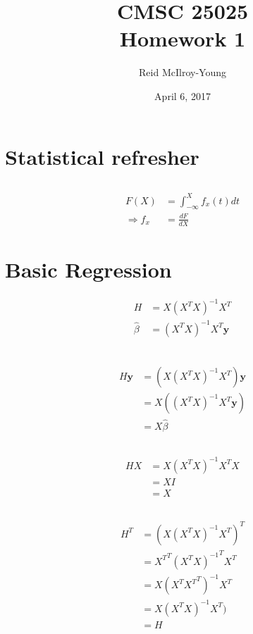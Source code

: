 \documentclass[12pt,a4paper]{article}
\author{Reid McIlroy-Young}
\title{CMSC 25025 \\ Homework 1}
\date{April 6, 2017}
\begin{document}
\maketitle

\section{Statistical refresher}
\subsection{}

\begin{align}
F(X) &= \int_{-\infty}^{X} f_x(t) dt\\
\Rightarrow f_x&= \frac{dF}{dX}
\end{align}

\section{Basic Regression}
\begin{align}
H &= X(X^T X)^{-1}X^T\\
\hat{\beta} &= (X^T X)^{-1}X^T\mathbf{y}\\
\end{align}

\subsection{}
\begin{align*}
H\textbf{y}&= (X(X^T X)^{-1}X^T)\textbf{y}\\
&=X((X^T X)^{-1}X^T\textbf{y})\\
 &= X\hat{\beta}
\end{align*}

\subsection{}
\begin{align*}
HX&= X(X^T X)^{-1}X^TX\\
&= XI\\
&=X
\end{align*}

\subsection{}
\begin{align*}
H^T&= (X(X^T X)^{-1}X^T)^T\\
&= {X^T}^T{(X^T X)^{-1}}^TX^T\\
&= X(X^T {X^T}^T)^{-1}X^T\\
&= X(X^T X)^{-1}X^T)\\
&= H
\end{align*}
\end{document}
